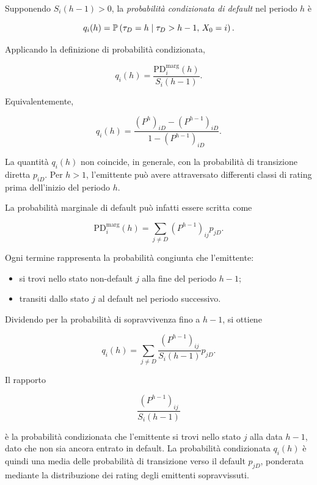 \begin{definition}
Supponendo $S_i(h-1)>0$, la \emph{probabilit\`{a} condizionata di
default} nel periodo $h$ \`{e}

\[
q_i(h)
=
\mathbb{P}
\left(
\tau_D=h
\mid
\tau_D>h-1,\,
X_0=i
\right).
\]
\end{definition}

Applicando la definizione di probabilit\`{a} condizionata,

\[
q_i(h)
=
\frac{
\mathrm{PD}_{i}^{\mathrm{marg}}(h)
}{
S_i(h-1)
}.
\]

Equivalentemente,

\[
q_i(h)
=
\frac{
(P^h)_{iD}-(P^{h-1})_{iD}
}{
1-(P^{h-1})_{iD}
}.
\]

La quantit\`{a} $q_i(h)$ non coincide, in generale, con la
probabilit\`{a} di transizione diretta $p_{iD}$. Per $h>1$,
l'emittente pu\`{o} avere attraversato differenti classi di rating
prima dell'inizio del periodo $h$.

La probabilit\`{a} marginale di default pu\`{o} infatti essere scritta
come

\[
\mathrm{PD}_{i}^{\mathrm{marg}}(h)
=
\sum_{j\neq D}
(P^{h-1})_{ij}p_{jD}.
\]

Ogni termine rappresenta la probabilit\`{a} congiunta che
l'emittente:

\begin{itemize}

\item si trovi nello stato non-default $j$ alla fine del periodo
$h-1$;

\item transiti dallo stato $j$ al default nel periodo successivo.

\end{itemize}

Dividendo per la probabilit\`{a} di sopravvivenza fino a $h-1$, si
ottiene

\[
q_i(h)
=
\sum_{j\neq D}
\frac{
(P^{h-1})_{ij}
}{
S_i(h-1)
}
p_{jD}.
\]

Il rapporto

\[
\frac{
(P^{h-1})_{ij}
}{
S_i(h-1)
}
\]

\`{e} la probabilit\`{a} condizionata che l'emittente si trovi nello
stato $j$ alla data $h-1$, dato che non sia ancora entrato in
default. La probabilit\`{a} condizionata $q_i(h)$ \`{e} quindi una
media delle probabilit\`{a} di transizione verso il default
$p_{jD}$, ponderata mediante la distribuzione dei rating degli
emittenti sopravvissuti.

